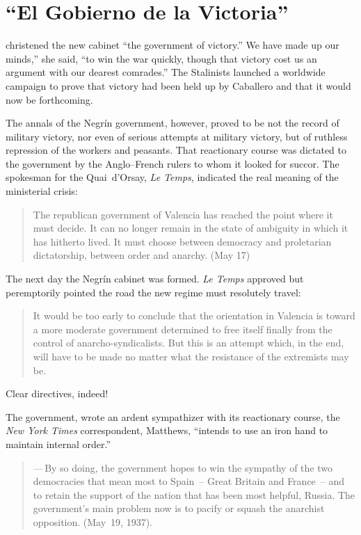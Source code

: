 \chapter{``El Gobierno de la Victoria''}

 christened the new cabinet ``the government of victory.'' We have made up our minds,'' she said, ``to win the war quickly, though that victory cost us an argument with our dearest comrades.'' The Stalinists launched a worldwide campaign to prove that victory had been held up by Caballero and that it would now be forthcoming.

The annals of the Negr\'in government, however, proved to be not the record of military victory, nor even of serious attempts at military victory, but of ruthless repression of the workers and peasants. That reactionary course was dictated to the government by the Anglo--French rulers to whom it looked for succor. The spokesman for the Quai~d’Orsay, \emph{Le Temps}, indicated the real meaning of the ministerial crisis:

\begin{quotation}
  The republican government of Valencia has reached the point where it must decide. It can no longer remain in the state of ambiguity in which it has hitherto lived. It must choose between democracy and proletarian dictatorship, between order and anarchy. (May 17)
\end{quotation}

The next day the Negr\'in cabinet was formed. \emph{Le Temps} approved but peremptorily pointed the road the new regime must resolutely travel:

\begin{quotation}
  It would be too early to conclude that the orientation in Valencia is toward a more moderate government determined to free itself finally from the control of anarcho-syndicalists. But this is an attempt which, in the end, will have to be made no matter what the resistance of the extremists may be.
\end{quotation}

Clear directives, indeed!

\medskip

The government, wrote an ardent sympathizer with its reactionary course, the \emph{New York Times} correspondent, Matthews, ``intends to use an iron hand to maintain internal order.''

\begin{quotation}
  \noindent
  —\,By so doing, the government hopes to win the sympathy of the two democracies that mean most to Spain~-- Great Britain and France~-- and to retain the support of the nation that has been most helpful, Russia. The government’s main problem now is to pacify or squash the anarchist opposition. (May~19, 1937).
\end{quotation}


